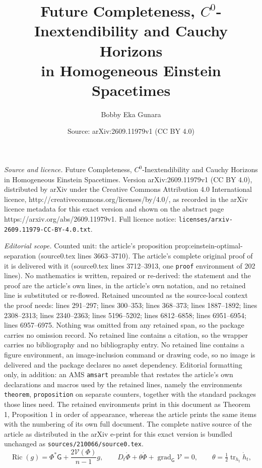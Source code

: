 \documentclass[10pt,a4paper]{amsart}
\title{Future Completeness, $C^0$-Inextendibility and Cauchy Horizons\\ in Homogeneous Einstein Spacetimes}
\author{Bobby Eka Gunara}
\date{Source: arXiv:2609.11979v1 (CC BY 4.0)}
\newcommand{\Ric}{\operatorname{Ric}}
\begin{document}
\maketitle

\noindent\emph{Source and licence.} Future Completeness, $C^0$-Inextendibility and Cauchy Horizons\\ in Homogeneous Einstein Spacetimes. Version arXiv:2609.11979v1 (CC BY 4.0), distributed by arXiv under the Creative Commons Attribution 4.0 International licence, http://creativecommons.org/licenses/by/4.0/, as recorded in the arXiv licence metadata for this exact version and shown on the abstract page https://arxiv.org/abs/2609.11979v1. Full licence notice: \texttt{licenses/arxiv-2609.11979-CC-BY-4.0.txt}.\par\smallskip

\noindent\textit{Editorial scope.} Counted unit: the article's proposition prop:einstein-optimal-separation (source0.tex lines 3663--3710). The article's complete original proof of it is delivered with it (source0.tex lines 3712--3913, one \texttt{proof} environment of 202 lines). No mathematics is written, repaired or re-derived: the statement and the proof are the article's own lines, in the article's own notation, and no retained line is substituted or re-flowed.  Retained uncounted as the source-local context the proof needs: lines 291--297; lines 300--353; lines 368--373; lines 1887--1892; lines 2308--2313; lines 2340--2363; lines 5196--5202; lines 6812--6858; lines 6951--6954; lines 6957--6975.  Nothing was omitted from any retained span, so the package carries no omission record.  No retained line contains a citation, so the wrapper carries no bibliography and no bibliography entry.  No retained line contains a figure environment, an image-inclusion command or drawing code, so no image is delivered and the package declares no asset dependency.  Editorial formatting only, in addition: an AMS \texttt{amsart} preamble that restates the article's own declarations and macros used by the retained lines, namely the environments \texttt{theorem}, \texttt{proposition} on separate counters, together with the standard packages those lines need.  The retained environments print in this document as Theorem 1, Proposition 1 in order of appearance, whereas the article prints the same items with the numbering of its own full document.  The complete native source of the article as distributed in the arXiv e-print for this exact version is bundled unchanged as \texttt{sources/210066/source0.tex}.
\begin{equation}
 \Ric(g)=\Phi^*\mathsf G+\frac{2\mathcal V(\Phi)}{n-1}g,
 \qquad D_t\dot\Phi+\theta\dot\Phi+
             \operatorname{grad}_{\mathsf G}\mathcal V=0,
 \qquad \theta=\tfrac12\operatorname{tr}_{h_t}\dot h_t,
 \label{eq:main-sigma-normalization}
\end{equation}
\end{document}
